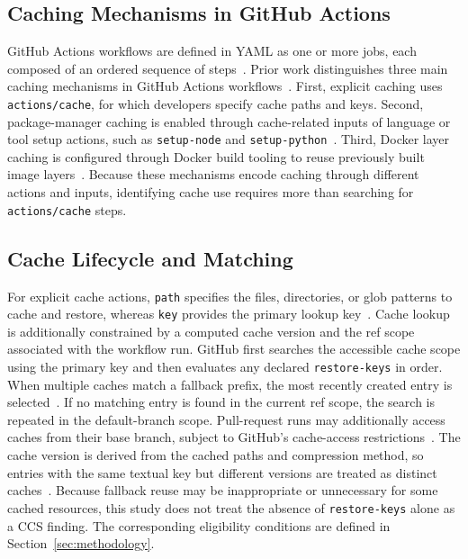 \documentclass[smallextended]{svjour3}
\begin{document}
\subsection{Caching Mechanisms in GitHub Actions}

GitHub Actions workflows are defined in YAML as one or more jobs, each composed of an ordered sequence of steps~\citep{gha_workflow_docs}. Prior work distinguishes three main caching mechanisms in GitHub Actions workflows~\citep{hasan2026caching}. First, explicit caching uses \texttt{actions/cache}, for which developers specify cache paths and keys. Second, package-manager caching is enabled through cache-related inputs of language or tool setup actions, such as \texttt{setup-node} and \texttt{setup-python}~\citep{gha_cache_docs}. Third, Docker layer caching is configured through Docker build tooling to reuse previously built image layers~\citep{hasan2026caching}. Because these mechanisms encode caching through different actions and inputs, identifying cache use requires more than searching for \texttt{actions/cache} steps.

\enlargethispage{3\baselineskip}
\subsection{Cache Lifecycle and Matching}

For explicit cache actions, \texttt{path} specifies the files, directories, or glob patterns to cache and restore, whereas \texttt{key} provides the primary lookup key~\citep{gha_cache_docs}. Cache lookup is additionally constrained by a computed cache version and the ref scope associated with the workflow run. GitHub first searches the accessible cache scope using the primary key and then evaluates any declared \texttt{restore-keys} in order. When multiple caches match a fallback prefix, the most recently created entry is selected~\citep{gha_cache_docs}. If no matching entry is found in the current ref scope, the search is repeated in the default-branch scope. Pull-request runs may additionally access caches from their base branch, subject to GitHub's cache-access restrictions~\citep{gha_cache_docs}. The cache version is derived from the cached paths and compression method, so entries with the same textual key but different versions are treated as distinct caches~\citep{gha_cache_docs}. Because fallback reuse may be inappropriate or unnecessary for some cached resources, this study does not treat the absence of \texttt{restore-keys} alone as a CCS finding. The corresponding eligibility conditions are defined in Section~\ref{sec:methodology}.
\end{document}

